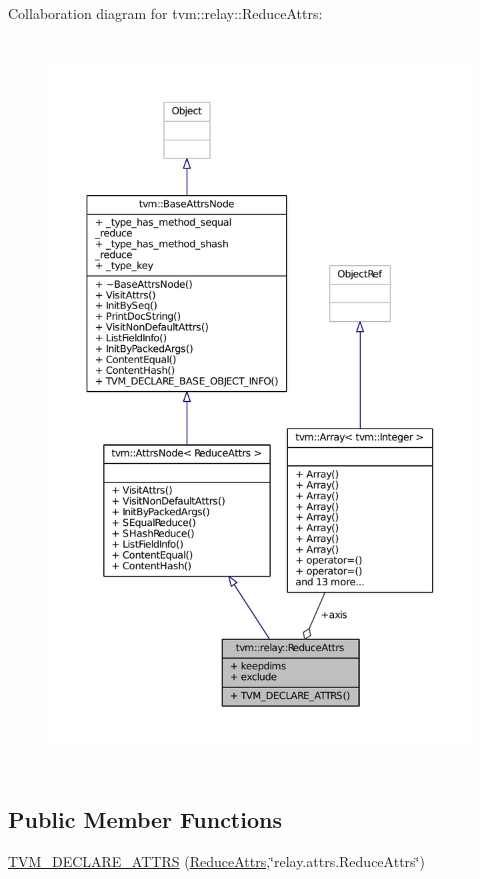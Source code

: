 Collaboration diagram for tvm\+:\+:relay\+:\+:Reduce\+Attrs\+:
\nopagebreak
\begin{figure}[H]
\begin{center}
\leavevmode
\includegraphics[height=550pt]{structtvm_1_1relay_1_1ReduceAttrs__coll__graph}
\end{center}
\end{figure}
\subsection*{Public Member Functions}
\begin{DoxyCompactItemize}
\item 
\hyperlink{structtvm_1_1relay_1_1ReduceAttrs_a93fcfcbd10f580bbbb4bd08e32c3fb13}{T\+V\+M\+\_\+\+D\+E\+C\+L\+A\+R\+E\+\_\+\+A\+T\+T\+RS} (\hyperlink{structtvm_1_1relay_1_1ReduceAttrs}{Reduce\+Attrs},\char`\"{}relay.\+attrs.\+Reduce\+Attrs\char`\"{})
\end{DoxyCompactItemize}
